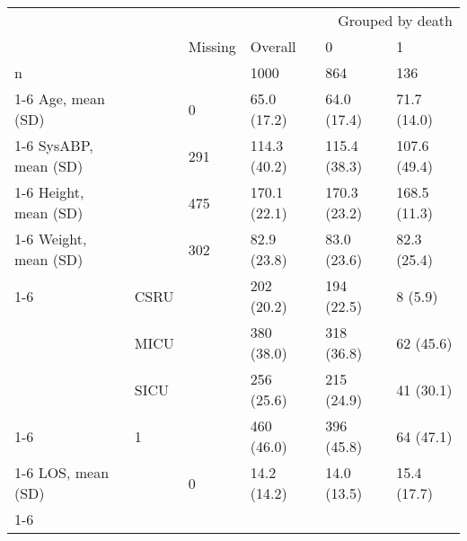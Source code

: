 \begin{tabular}{llllll}
\toprule
 &  & \multicolumn{4}{r}{Grouped by death} \\
 &  & Missing & Overall & 0 & 1 \\
\midrule
n &  &  & 1000 & 864 & 136 \\
\cline{1-6}
Age, mean (SD) &  & 0 & 65.0 (17.2) & 64.0 (17.4) & 71.7 (14.0) \\
\cline{1-6}
SysABP, mean (SD) &  & 291 & 114.3 (40.2) & 115.4 (38.3) & 107.6 (49.4) \\
\cline{1-6}
Height, mean (SD) &  & 475 & 170.1 (22.1) & 170.3 (23.2) & 168.5 (11.3) \\
\cline{1-6}
Weight, mean (SD) &  & 302 & 82.9 (23.8) & 83.0 (23.6) & 82.3 (25.4) \\
\cline{1-6}
\multirow[t]{4}{*}{ICU, n (%
 & CSRU &  & 202 (20.2) & 194 (22.5) & 8 (5.9) \\
 & MICU &  & 380 (38.0) & 318 (36.8) & 62 (45.6) \\
 & SICU &  & 256 (25.6) & 215 (24.9) & 41 (30.1) \\
\cline{1-6}
\multirow[t]{2}{*}{MechVent, n (%
 & 1 &  & 460 (46.0) & 396 (45.8) & 64 (47.1) \\
\cline{1-6}
LOS, mean (SD) &  & 0 & 14.2 (14.2) & 14.0 (13.5) & 15.4 (17.7) \\
\cline{1-6}
\bottomrule
\end{tabular}
